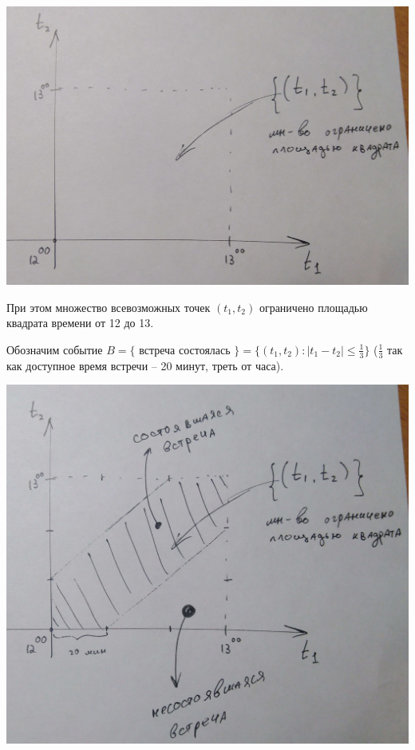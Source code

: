 \documentclass{article}
\begin{document}
\begin{center}
    \includegraphics[scale=0.16]{1_1.jpg}
\end{center}

При этом множество всевозможных точек $(t_1, t_2)$ ограничено площадью квадрата времени от 12 до 13.

Обозначим событие $B = \{$ встреча состоялась $\} = \{(t_1, t_2) : |t_1 - t_2| \leq \frac{1}{3}\}$ ($\frac{1}{3}$ так как доступное время встречи -- 20 минут, треть от часа).

\begin{center}
    \includegraphics[scale=0.2]{1_2.jpg}
\end{center}
\end{document}
